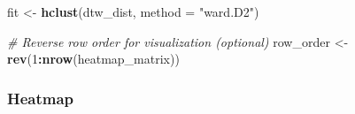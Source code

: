 \documentclass[
  11pt,
]{article}
\newenvironment{Shaded}{\begin{snugshade}}{\end{snugshade}}
\newcommand{\AttributeTok}[1]{\textcolor[rgb]{0.13,0.29,0.53}{#1}}
\newcommand{\CommentTok}[1]{\textcolor[rgb]{0.56,0.35,0.01}{\textit{#1}}}
\newcommand{\DecValTok}[1]{\textcolor[rgb]{0.00,0.00,0.81}{#1}}
\newcommand{\FunctionTok}[1]{\textcolor[rgb]{0.13,0.29,0.53}{\textbf{#1}}}
\newcommand{\NormalTok}[1]{#1}
\newcommand{\OtherTok}[1]{\textcolor[rgb]{0.56,0.35,0.01}{#1}}
\newcommand{\SpecialCharTok}[1]{\textcolor[rgb]{0.81,0.36,0.00}{\textbf{#1}}}
\newcommand{\StringTok}[1]{\textcolor[rgb]{0.31,0.60,0.02}{#1}}
\begin{document}
\begin{Shaded}
\begin{Highlighting}[]
\NormalTok{fit }\OtherTok{\textless{}{-}} \FunctionTok{hclust}\NormalTok{(dtw\_dist, }\AttributeTok{method =} \StringTok{"ward.D2"}\NormalTok{)}

\CommentTok{\# Reverse row order for visualization (optional)}
\NormalTok{row\_order }\OtherTok{\textless{}{-}} \FunctionTok{rev}\NormalTok{(}\DecValTok{1}\SpecialCharTok{:}\FunctionTok{nrow}\NormalTok{(heatmap\_matrix))}
\end{Highlighting}
\end{Shaded}

\subsubsection{Heatmap}\label{heatmap}
\end{document}
